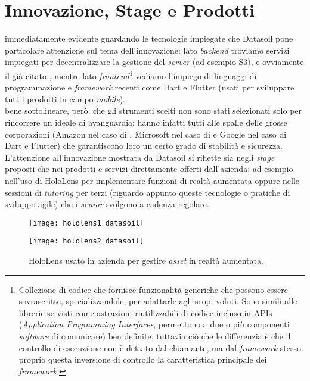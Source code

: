 \section{Innovazione, Stage e Prodotti}
\e{} immediatamente evidente guardando le tecnologie impiegate che Datasoil pone particolare attenzione sul tema dell'innovazione: lato \textit{backend} troviamo servizi \aws{} impiegati per decentralizzare la gestione del \textit{server} (ad esempio S3), e ovviamente il già citato \asa{}, mentre lato \textit{frontend}\footnote{Collezione di codice che fornisce funzionalità generiche che possono essere sovrascritte, specializzandole, per adattarle agli scopi voluti. Sono simili alle librerie se visti come astrazioni riutilizzabili di codice incluso in APIs (\textit{Application Programming Interfaces}, permettono a due o più componenti \textit{software} di comunicare) ben definite, tuttavia ciò che le differenzia è che il controllo di esecuzione non è dettato dal chiamante, ma dal \textit{framework} stesso. \e{} proprio questa inversione di controllo la caratteristica principale dei \textit{framework}.} vediamo l'impiego di linguaggi di programmazione e \textit{framework} recenti come Dart e Flutter (usati per sviluppare tutt i prodotti in campo \textit{mobile}).\\
\e{} bene sottolineare, però, che gli strumenti scelti non sono stati selezionati solo per rincorrere un ideale di avanguardia: hanno infatti tutti alle spalle delle grosse corporazioni (Amazon nel caso di \aws{}, Microsoft nel caso di \asa{} e Google nel caso di Dart e Flutter) che garantiscono loro un certo grado di stabilità e sicurezza.\\
L'attenzione all'innovazione mostrata da Datasoil si riflette sia negli \textit{stage} proposti che nei prodotti e servizi direttamente offerti dall'azienda: ad esempio nell'uso di HoloLens per implementare funzioni di realtà aumentata oppure nelle sessioni di \textit{tutoring} per terzi (riguardo appunto queste tecnologie o pratiche di sviluppo agile) che i \textit{senior} svolgono a cadenza regolare.
\begin{figure}[H]
    \centering
    \begin{minipage}{.5\textwidth}
      \centering
      \texttt{[image: hololens1\_datasoil]}
      \label{fig:test1}
    \end{minipage}%
    \begin{minipage}{.5\textwidth}
      \centering
      \texttt{[image: hololens2\_datasoil]}
    \end{minipage}
    \caption[HoloLens usato in azienda]{HoloLens usato in azienda per gestire \textit{asset} in realtà aumentata.\footnotemark}
\end{figure}
